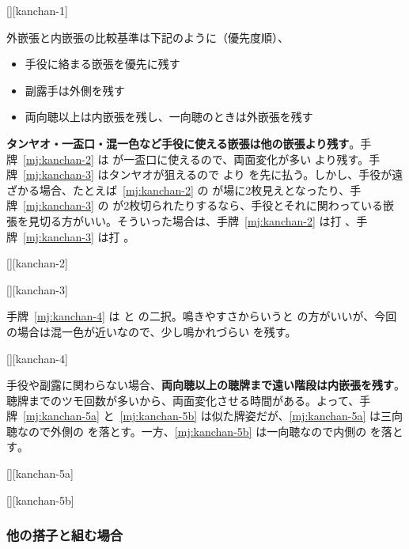 \documentclass[../nankiru_main.tex]{subfiles}
\begin{document}
[][kanchan-1]

外嵌張と内嵌張の比較基準は下記のように（優先度順）\citep{yoteru-kanchan}、

\begin{itemize}
  \item 手役に絡まる嵌張を優先に残す
  \item 副露手は外側を残す
  \item 両向聴以上は内嵌張を残し、一向聴のときは外嵌張を残す
\end{itemize}

\textbf{タンヤオ・一盃口・混一色など手役に使える嵌張は他の嵌張より残す}。手牌~\ref{mj:kanchan-2} は  が一盃口に使えるので、両面変化が多い  より残す。手牌~\ref{mj:kanchan-3} はタンヤオが狙えるので  より  を先に払う。しかし、手役が遠ざかる場合、たとえば~\ref{mj:kanchan-2} の  が場に2枚見えとなったり、手牌~\ref{mj:kanchan-3} の  が2枚切られたりするなら、手役とそれに関わっている嵌張を見切る方がいい。そういった場合は、手牌~\ref{mj:kanchan-2} は打 、手牌~\ref{mj:kanchan-3} は打  \citep{yoteru-kanchan}。

[][kanchan-2]

[][kanchan-3]

手牌~\ref{mj:kanchan-4} は  と  の二択。鳴きやすさからいうと  の方がいいが、今回の場合は混一色が近いなので、少し鳴かれづらい  を残す\citep{yoteru-kanchan}。

[][kanchan-4]

手役や副露に関わらない場合、\textbf{両向聴以上の聴牌まで遠い階段は内嵌張を残す}。聴牌までのツモ回数が多いから、両面変化させる時間がある。よって、手牌~\ref{mj:kanchan-5a} と~\ref{mj:kanchan-5b} は似た牌姿だが、\ref{mj:kanchan-5a} は三向聴なので外側の  を落とす。一方、\ref{mj:kanchan-5b} は一向聴なので内側の  を落とす\citep{yoteru-kanchan}。

[][kanchan-5a]

[][kanchan-5b]


\subsubsection*{他の搭子と組む場合}
\end{document}
